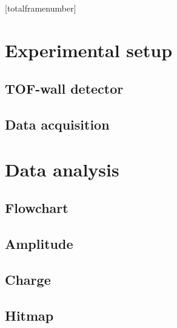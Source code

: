 \documentclass[9pt]{beamer}
\begin{document}
	[totalframenumber] 
	\frame{\titlepage}

	

	\section{Experimental setup}
		\subsection{TOF-wall detector}
			
			
			
		\subsection{Data acquisition}
			
		
	\section{Data analysis}
		\subsection{Flowchart}
			
		\subsection{Amplitude}
			
			
		\subsection{Charge}
			
			
		\subsection{Hitmap}
			
			

		
\end{document}

